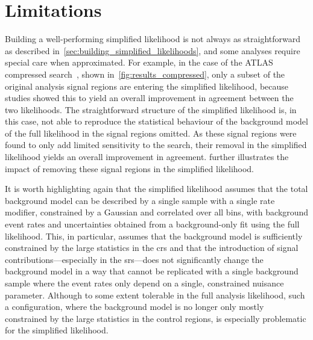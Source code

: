 \section{Limitations}\label{sec:simplify_limitations}

Building a well-performing simplified likelihood is not always as straightforward as described in~\cref{sec:building_simplified_likelihoods}, and some analyses require special care when approximated. For example, in the case of the ATLAS compressed search~\cite{SUSY-2018-16}, shown in~\cref{fig:results_compressed}, only a subset of the original analysis signal regions are entering the simplified likelihood, because studies showed this to yield an overall improvement in agreement between the two likelihoods. The straightforward structure of the simplified likelihood is, in this case, not able to reproduce the statistical behaviour of the background model of the full likelihood in the signal regions omitted. As these signal regions were found to only add limited sensitivity to the search, their removal in the simplified likelihood yields an overall improvement in agreement.  further illustrates the impact of removing these signal regions in the simplified likelihood.

It is worth highlighting again that the simplified likelihood assumes that the total background model can be described by a single sample with a single rate modifier, constrained by a Gaussian and correlated over all bins, with background event rates and uncertainties obtained from a background-only fit using the full likelihood.
This, in particular, assumes that the background model is sufficiently constrained by the large statistics in the \glspl{cr} and that the introduction of signal contributions---especially in the \glspl{sr}---does not significantly change the background model in a way that cannot be replicated with a single background sample where the event rates only depend on a single, constrained nuisance parameter.
Although to some extent tolerable in the full analysis likelihood, such a configuration, where the background model is no longer only mostly constrained by the large statistics in the control regions, is especially problematic for the simplified likelihood.


